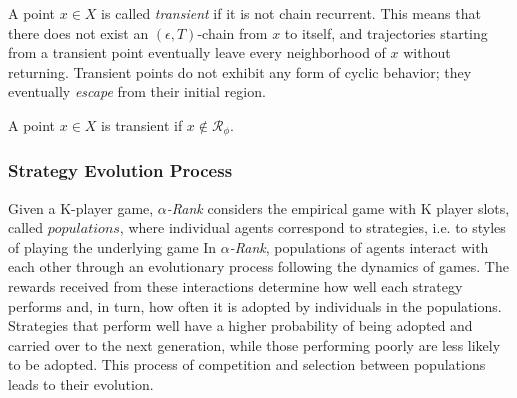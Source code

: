 \begin{flushleft}
\begin{flushleft}
        \begin{flushleft}
            A point $x \in X$ is called \emph{transient} if it is not chain recurrent. This means that there does not exist an $(\epsilon, T)$-chain from $x$ to itself, and trajectories starting from a transient point eventually leave every neighborhood of $x$ without returning. Transient points do not exhibit any form of cyclic behavior; they eventually \emph{escape} from their initial region.
        
            \begin{definition}
                A point $x \in X$ is transient if $x \notin \mathcal{R}_\phi$.
            \end{definition}

        \end{flushleft}

    \end{flushleft}
        
    \subsubsection{Strategy Evolution Process}

    \begin{flushleft}

        Given a K-player game, \emph{$\alpha$-Rank} considers the empirical game with K player slots, called $populations$, where individual agents correspond to strategies, i.e. to styles of playing the underlying game In \emph{$\alpha$-Rank}, populations of agents interact with each other through an evolutionary process following the dynamics of games. The rewards received from these interactions determine how well each strategy performs and, in turn, how often it is adopted by individuals in the populations. Strategies that perform well have a higher probability of being adopted and carried over to the next generation, while those performing poorly are less likely to be adopted. This process of competition and selection between populations leads to their evolution.\\~\\


\end{flushleft}
\end{flushleft}

